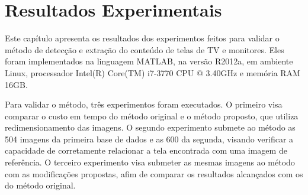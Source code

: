 \chapter{Resultados Experimentais}


















Este capítulo apresenta os resultados dos experimentos feitos para validar o método de detecção e extração do conteúdo de telas de TV e monitores. Eles foram implementados na linguagem MATLAB, na versão R2012a, em ambiente Linux, processador Intel(R) Core(TM) i7-3770 CPU @ 3.40GHz e memória RAM 16GB.

Para validar o método, três experimentos foram executados. O primeiro visa comparar o custo em tempo do método original e o método proposto, que utiliza redimensionamento das imagens. O segundo experimento submete ao método as 504 imagens da primeira base de dados e as 600 da segunda, visando verificar a capacidade de corretamente relacionar a tela encontrada com uma imagem de referência. O terceiro experimento visa submeter as mesmas imagens ao método com as modificações propostas, afim de comparar os resultados alcançados com os do método original.



